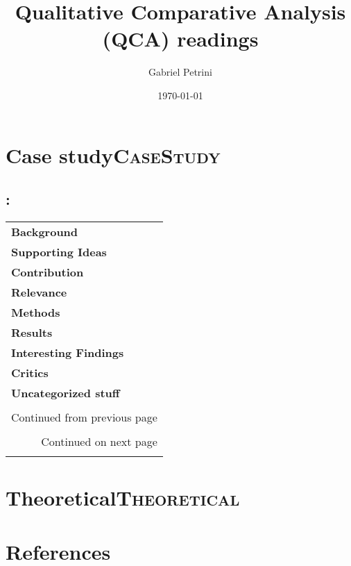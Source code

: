 \documentclass[11pt]{article}
\author{Gabriel Petrini}
\date{\today}
\title{Qualitative Comparative Analysis (QCA) readings}
\begin{document}
\maketitle
\tableofcontents


\section{Case study\hfill{}\textsc{CaseStudy}}
\label{sec:org5bfade9}

\subsection{\citeauthor{lili_dynamic_2020}: }
\label{sec:org97ff468}

\begin{longtable}{l|p{}}
\hline
\hline
\textbf{Background} & \\
\textbf{Supporting Ideas} & \\
\textbf{Contribution} & \\
\textbf{Relevance} & \\
\textbf{Methods} & \\
\textbf{Results} & \\
\textbf{Interesting Findings} & \\
\textbf{Critics} & \\
\textbf{Uncategorized stuff} & \\
 & \\
\hline
\endfirsthead
\multicolumn{2}{l}{Continued from previous page} \\

 &  \\

\hline
\endhead
\hline\multicolumn{2}{r}{Continued on next page} \\
\endfoot
\endlastfoot
\hline
\hline
\end{longtable}

\section{Theoretical\hfill{}\textsc{Theoretical}}
\label{sec:orgcc3ffa3}
\section*{References}
\label{sec:org27541fd}
\printbibliography[heading=none]
\end{document}

